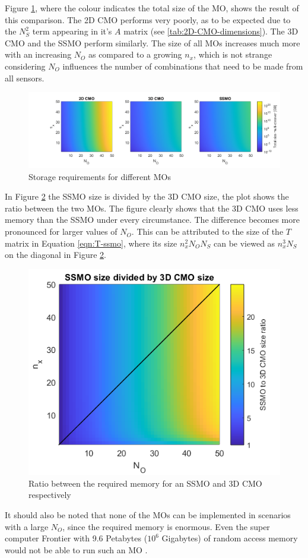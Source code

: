 Figure \ref{fig:MO-storage}, where the colour indicates the total size of the MO, shows the result of this comparison. The 2D CMO performs very poorly, as to be expected due to the $N_S^2$ term appearing in it's $A$ matrix (see \autoref{tab:2D-CMO-dimensions}). The 3D CMO and the SSMO perform similarly. The size of all MOs increases much more with an increasing $N_O$ as compared to a growing $n_x$, which is not strange considering $N_O$ influences the number of combinations that need to be made from all sensors.


\begin{figure}[H]
    \centering
    \includegraphics[width=\linewidth]{report/Figures/sizeComparison60.png}
    \caption{Storage requirements for different MOs}
    \label{fig:MO-storage}
\end{figure}


In Figure \ref{fig:ssmo-vs-3dcmo} the SSMO size is divided by the 3D CMO size, the plot shows the ratio between the two MOs. The figure clearly shows that the 3D CMO uses less memory than the SSMO under every circumstance. The difference becomes more pronounced for larger values of $N_O$. This can be attributed to the size of the $T$ matrix in Equation \ref{eqn:T-ssmo}, where its size $n_x^2N_ON_S$ can be viewed as $n_x^3N_S$ on the diagonal in Figure \ref{fig:ssmo-vs-3dcmo}.

\begin{figure}[H]
    \centering
    \includegraphics[width=0.4\linewidth]{report/Figures/ssmo_vs_3dcmo.png}
    \caption{Ratio between the required memory for an SSMO and 3D CMO respectively}
    \label{fig:ssmo-vs-3dcmo}
\end{figure}

It should also be noted that none of the MOs can be implemented in scenarios with a large $N_O$, since the required memory is enormous. Even the super computer Frontier with 9.6 Petabytes ($10^6$ Gigabytes) of random access memory would not be able to run such an MO \cite{2024FrontierDocumentation}.